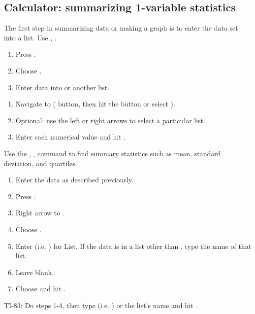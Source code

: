 \subsection{Calculator: summarizing 1-variable statistics}
\label{TIsummarizedata}

\begin{termBox}{
The first step in summarizing data or making a graph is to  enter the data set into a list. Use , .
\begin{enumerate}
\setlength{\itemsep}{0mm}
\item Press .
\item Choose .
\item Enter data into  or another list.
\end{enumerate}
}
\end{termBox}

\textA{\newpage}

\begin{termBox}{
\begin{enumerate}
\setlength{\itemsep}{0mm}
\item Navigate to  ( button, then hit the  button or select ).
\item Optional: use the left or right arrows to select a particular list.
\item Enter each numerical value and hit .
\end{enumerate}
}
\end{termBox}

\begin{termBox}{
Use the , ,  command to find summary statistics such as mean, standard deviation, and quartiles.
\begin{enumerate}
\setlength{\itemsep}{0mm}
\item Enter the data as described previously.
\item Press .
\item Right arrow to .
\item Choose .
\item Enter  (i.e.  ) for List. If the data is in a list other than , type the name of that list.
\item Leave  blank.
\item Choose  and hit .
\end{enumerate}
TI-83: Do steps 1-4, then type  (i.e.  ) or the list's name and hit .
}
\end{termBox}


